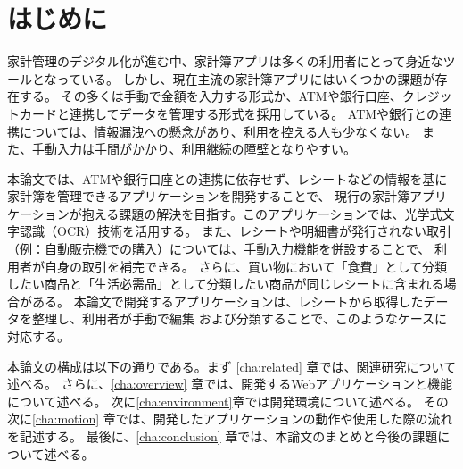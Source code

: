 \documentclass[main]{subfiles}
\begin{document}
\chapter{はじめに}
\label{cha:intro}

家計管理のデジタル化が進む中、家計簿アプリは多くの利用者にとって身近なツールとなっている。
しかし、現在主流の家計簿アプリにはいくつかの課題が存在する。
その多くは手動で金額を入力する形式か、ATMや銀行口座、クレジットカードと連携してデータを管理する形式を採用している。
ATMや銀行との連携については、情報漏洩への懸念があり、利用を控える人も少なくない。
また、手動入力は手間がかかり、利用継続の障壁となりやすい。

本論文では、ATMや銀行口座との連携に依存せず、レシートなどの情報を基に家計簿を管理できるアプリケーションを開発することで、
現行の家計簿アプリケーションが抱える課題の解決を目指す。このアプリケーションでは、光学式文字認識（OCR）技術を活用する。
また、レシートや明細書が発行されない取引（例：自動販売機での購入）については、手動入力機能を併設することで、
利用者が自身の取引を補完できる。
さらに、買い物において「食費」として分類したい商品と「生活必需品」として分類したい商品が同じレシートに含まれる場合がある。
本論文で開発するアプリケーションは、レシートから取得したデータを整理し、利用者が手動で編集
および分類することで、このようなケースに対応する。

本論文の構成は以下の通りである。まず \ref{cha:related} 章では、関連研究について述べる。
さらに、\ref{cha:overview} 章では、開発するWebアプリケーションと機能について述べる。
次に\ref{cha:environment}章では開発環境について述べる。
その次に\ref{cha:motion} 章では、開発したアプリケーションの動作や使用した際の流れを記述する。
最後に、\ref{cha:conclusion} 章では、本論文のまとめと今後の課題について述べる。
\end{document}
